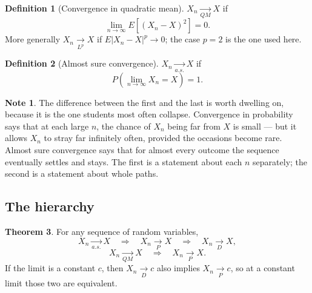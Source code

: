 \documentclass[11pt,a4paper]{article}
\theoremstyle{definition}
\newtheorem{thm}{Theorem}[subsection]
\newtheorem{defn}[thm]{Definition}
\newtheorem*{note}{Note}
\begin{document}
\begin{defn}[Convergence in quadratic mean]
$X_n \underset{QM}{\longrightarrow} X$ if
$$\lim_{n\rightarrow\infty} E\left[\left(X_n - X\right)^{2}\right] = 0 .$$
More generally $X_n \underset{L^p}{\longrightarrow} X$ if
$E\left|X_n-X\right|^{p}\rightarrow 0$; the case $p=2$ is the one used here.
\end{defn}

\begin{defn}[Almost sure convergence]
$X_n \underset{a.s.}{\longrightarrow} X$ if
$$P\left(\lim_{n\rightarrow\infty} X_n = X\right) = 1 .$$
\end{defn}

\begin{note}
The difference between the first and the last is worth dwelling on, because it
is the one students most often collapse. Convergence in probability says that at
each large $n$, the chance of $X_n$ being far from $X$ is small --- but it
allows $X_n$ to stray far infinitely often, provided the occasions become rare.
Almost sure convergence says that for almost every outcome the sequence
eventually settles and stays. The first is a statement about each $n$
separately; the second is a statement about whole paths.
\end{note}

\subsection{The hierarchy}

\begin{thm}
For any sequence of random variables,
$$X_n \underset{a.s.}{\longrightarrow} X
\quad\Longrightarrow\quad X_n \underset{P}{\longrightarrow} X
\quad\Longrightarrow\quad X_n \underset{D}{\longrightarrow} X,$$
$$X_n \underset{QM}{\longrightarrow} X
\quad\Longrightarrow\quad X_n \underset{P}{\longrightarrow} X .$$
If the limit is a constant $c$, then $X_n \underset{D}{\longrightarrow} c$ also
implies $X_n \underset{P}{\longrightarrow} c$, so at a constant limit those two
are equivalent.
\end{thm}
\end{document}
